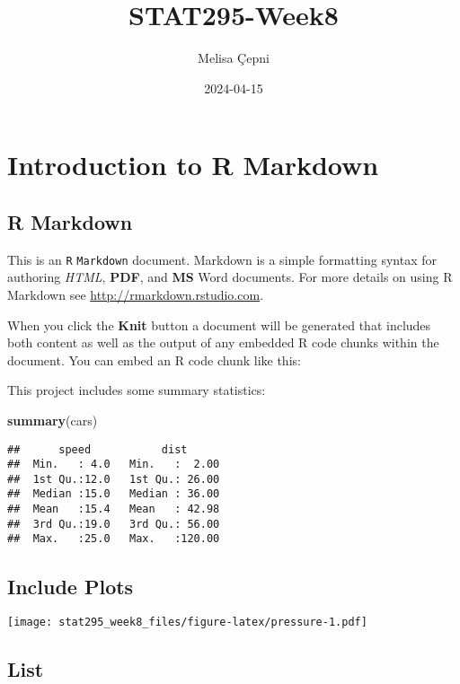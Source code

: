 \documentclass[
]{article}
\title{STAT295-Week8}
\author{Melisa Çepni}
\date{2024-04-15}
\newenvironment{Shaded}{\begin{snugshade}}{\end{snugshade}}
\newcommand{\FunctionTok}[1]{\textcolor[rgb]{0.13,0.29,0.53}{\textbf{#1}}}
\newcommand{\NormalTok}[1]{#1}
\begin{document}
\maketitle

{
\setcounter{tocdepth}{2}
\tableofcontents
}
\hypertarget{introduction-to-r-markdown}{%
\section{Introduction to R Markdown}\label{introduction-to-r-markdown}}

\hypertarget{r-markdown}{%
\subsection{R Markdown}\label{r-markdown}}

This is an \texttt{R} \texttt{Markdown} document. Markdown is a simple formatting syntax for authoring \emph{HTML}, \textbf{PDF}, and \textbf{MS} Word documents. For more details on using R Markdown see \url{http://rmarkdown.rstudio.com}.

When you click the \textbf{Knit} button a document will be generated that includes both content as well as the output of any embedded R code chunks within the document. You can embed an R code chunk like this:

This project includes some summary statistics:

\begin{Shaded}
\begin{Highlighting}[]
\FunctionTok{summary}\NormalTok{(cars)}
\end{Highlighting}
\end{Shaded}

\begin{verbatim}
##      speed           dist       
##  Min.   : 4.0   Min.   :  2.00  
##  1st Qu.:12.0   1st Qu.: 26.00  
##  Median :15.0   Median : 36.00  
##  Mean   :15.4   Mean   : 42.98  
##  3rd Qu.:19.0   3rd Qu.: 56.00  
##  Max.   :25.0   Max.   :120.00
\end{verbatim}

\hypertarget{include-plots}{%
\subsection{Include Plots}\label{include-plots}}

\texttt{[image: stat295\_week8\_files/figure-latex/pressure-1.pdf]}

\hypertarget{list}{%
\subsection{List}\label{list}}
\end{document}
